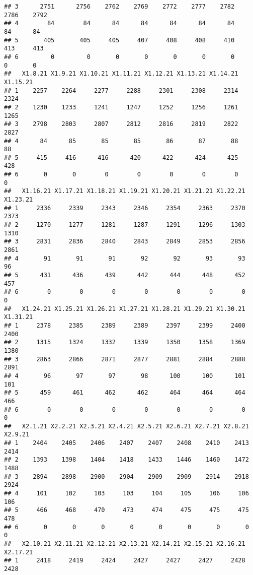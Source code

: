 \documentclass[
]{article}
\begin{document}
\begin{verbatim}
## 3      2751      2756    2762    2769    2772    2777    2782    2786    2792
## 4        84        84      84      84      84      84      84      84      84
## 5       405       405     405     407     408     408     410     413     413
## 6         0         0       0       0       0       0       0       0       0
##   X1.8.21 X1.9.21 X1.10.21 X1.11.21 X1.12.21 X1.13.21 X1.14.21 X1.15.21
## 1    2257    2264     2277     2288     2301     2308     2314     2324
## 2    1230    1233     1241     1247     1252     1256     1261     1265
## 3    2798    2803     2807     2812     2816     2819     2822     2827
## 4      84      85       85       85       86       87       88       88
## 5     415     416      416      420      422      424      425      428
## 6       0       0        0        0        0        0        0        0
##   X1.16.21 X1.17.21 X1.18.21 X1.19.21 X1.20.21 X1.21.21 X1.22.21 X1.23.21
## 1     2336     2339     2343     2346     2354     2363     2370     2373
## 2     1270     1277     1281     1287     1291     1296     1303     1310
## 3     2831     2836     2840     2843     2849     2853     2856     2861
## 4       91       91       91       92       92       93       93       96
## 5      431      436      439      442      444      448      452      457
## 6        0        0        0        0        0        0        0        0
##   X1.24.21 X1.25.21 X1.26.21 X1.27.21 X1.28.21 X1.29.21 X1.30.21 X1.31.21
## 1     2378     2385     2389     2389     2397     2399     2400     2400
## 2     1315     1324     1332     1339     1350     1358     1369     1380
## 3     2863     2866     2871     2877     2881     2884     2888     2891
## 4       96       97       97       98      100      100      101      101
## 5      459      461      462      462      464      464      464      466
## 6        0        0        0        0        0        0        0        0
##   X2.1.21 X2.2.21 X2.3.21 X2.4.21 X2.5.21 X2.6.21 X2.7.21 X2.8.21 X2.9.21
## 1    2404    2405    2406    2407    2407    2408    2410    2413    2414
## 2    1393    1398    1404    1418    1433    1446    1460    1472    1488
## 3    2894    2898    2900    2904    2909    2909    2914    2918    2924
## 4     101     102     103     103     104     105     106     106     106
## 5     466     468     470     473     474     475     475     475     478
## 6       0       0       0       0       0       0       0       0       0
##   X2.10.21 X2.11.21 X2.12.21 X2.13.21 X2.14.21 X2.15.21 X2.16.21 X2.17.21
## 1     2418     2419     2424     2427     2427     2427     2428     2428

\end{verbatim}
\end{document}
